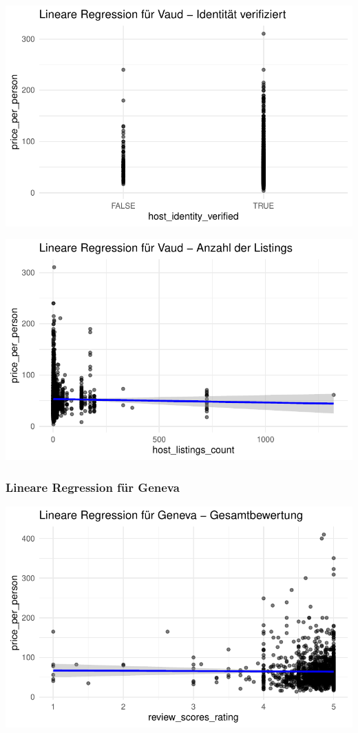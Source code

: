 \documentclass[
  journal,
]{IEEEtran}%
\begin{document}
\includegraphics{main_files/figure-pdf/unnamed-chunk-14-5.pdf}

\includegraphics{main_files/figure-pdf/unnamed-chunk-14-6.pdf}

\hypertarget{lineare-regression-fuxfcr-geneva}{%
\subsubsection{Lineare Regression für
Geneva}\label{lineare-regression-fuxfcr-geneva}}

\includegraphics{main_files/figure-pdf/unnamed-chunk-15-1.pdf}
\end{document}
